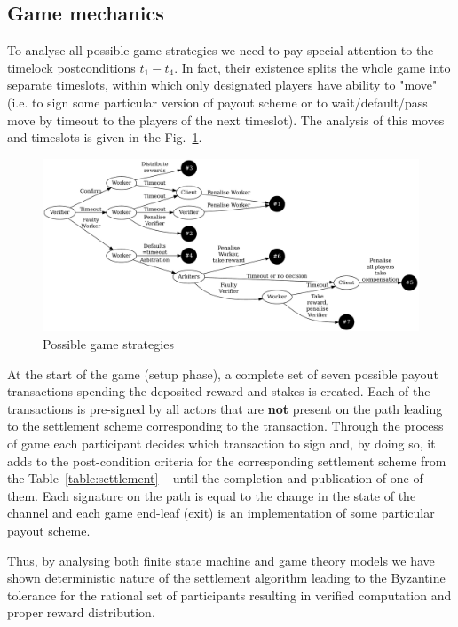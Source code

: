 \documentclass[a4paper]{article}
\begin{document}
\subsection{Game mechanics}
\label{game}

To analyse all possible game strategies we need to pay special attention to the timelock postconditions $t_1-t_4$. In fact, their existence splits the whole game into separate timeslots, within which only designated players have ability to "move" (i.e. to sign some particular version of payout scheme or to wait/default/pass move by timeout to the players of the next timeslot). The analysis of this moves and timeslots is given in the Fig.~\ref{fig:strategies}.

\begin{figure}[h!]
    \centering
    \begin{adjustbox}{center}
    \includegraphics[width=1.2\columnwidth]{assets/strategies.pdf}
    \end{adjustbox}
    \caption{Possible game strategies}
    \label{fig:strategies}
\end{figure}

At the start of the game (setup phase), a complete set of seven possible payout transactions spending the deposited reward and stakes is created. Each of the transactions is pre-signed by all actors that are \textbf{not} present on the path leading to the settlement scheme corresponding to the transaction. Through the process of game each participant decides which transaction to sign and, by doing so, it adds to the post-condition criteria for the corresponding settlement scheme from the Table~\ref{table:settlement} -- until the completion and publication of one of them. Each signature on the path is equal to the change in the state of the channel and each game end-leaf (exit) is an implementation of some particular payout scheme.

Thus, by analysing both finite state machine and game theory models we have shown deterministic nature of the settlement algorithm leading to the Byzantine tolerance for the rational set of participants resulting in verified computation and proper reward distribution.
\end{document}
